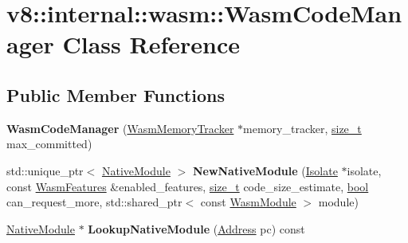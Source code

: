 \hypertarget{classv8_1_1internal_1_1wasm_1_1WasmCodeManager}{}\section{v8\+:\+:internal\+:\+:wasm\+:\+:Wasm\+Code\+Manager Class Reference}
\label{classv8_1_1internal_1_1wasm_1_1WasmCodeManager}
\subsection*{Public Member Functions}
\begin{DoxyCompactItemize}
\item 
\mbox{\label{classv8_1_1internal_1_1wasm_1_1WasmCodeManager_ab8e84676f1a42155d9b723c7b101047c}} 
{\bfseries Wasm\+Code\+Manager} (\mbox{\hyperlink{classv8_1_1internal_1_1wasm_1_1WasmMemoryTracker}{Wasm\+Memory\+Tracker}} $\ast$memory\+\_\+tracker, \mbox{\hyperlink{classsize__t}{size\+\_\+t}} max\+\_\+committed)
\item 
\mbox{\label{classv8_1_1internal_1_1wasm_1_1WasmCodeManager_a026784df2e9d15b94b4737bab288b220}} 
std\+::unique\+\_\+ptr$<$ \mbox{\hyperlink{classv8_1_1internal_1_1wasm_1_1NativeModule}{Native\+Module}} $>$ {\bfseries New\+Native\+Module} (\mbox{\hyperlink{classv8_1_1internal_1_1Isolate}{Isolate}} $\ast$isolate, const \mbox{\hyperlink{structv8_1_1internal_1_1wasm_1_1WasmFeatures}{Wasm\+Features}} \&enabled\+\_\+features, \mbox{\hyperlink{classsize__t}{size\+\_\+t}} code\+\_\+size\+\_\+estimate, \mbox{\hyperlink{classbool}{bool}} can\+\_\+request\+\_\+more, std\+::shared\+\_\+ptr$<$ const \mbox{\hyperlink{structv8_1_1internal_1_1wasm_1_1WasmModule}{Wasm\+Module}} $>$ module)
\item 
\mbox{\label{classv8_1_1internal_1_1wasm_1_1WasmCodeManager_a65237f5b80dae7a92d86f131b6df4461}} 
\mbox{\hyperlink{classv8_1_1internal_1_1wasm_1_1NativeModule}{Native\+Module}} $\ast$ {\bfseries Lookup\+Native\+Module} (\mbox{\hyperlink{classuintptr__t}{Address}} pc) const
\item 
\mbox{\label{classv8_1_1internal_1_1wasm_1_1WasmCodeManager_a2be288a7720a1f7bdf64f5060b7c782a}} 

\end{DoxyCompactItemize}
